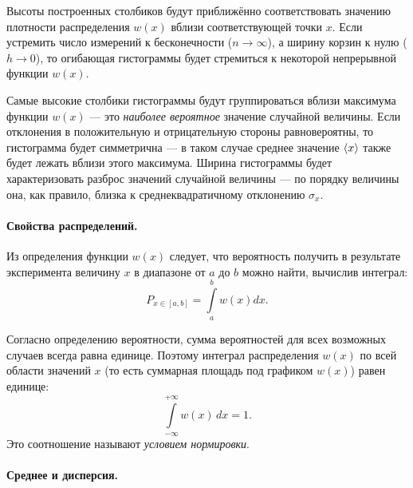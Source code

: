 Высоты построенных столбиков будут приближённо соответствовать значению
плотности распределения $w(x)$ вблизи соответствующей точки $x$.
Если устремить число измерений к бесконечности ($n\to \infty$), а ширину корзин
к нулю ($h\to0$), то огибающая гистограммы будет стремиться к некоторой
непрерывной функции $w(x)$.

Самые высокие столбики гистограммы будут группироваться вблизи максимума
функции $w(x)$ --- это \emph{наиболее вероятное} значение случайной величины.
Если отклонения в положительную и отрицательную стороны равновероятны,
то гистограмма будет симметрична --- в таком случае среднее значение $\left<x\right>$
также будет лежать вблизи этого максимума. Ширина гистограммы будет характеризовать разброс
значений случайной величины --- по порядку величины
она, как правило, близка к среднеквадратичному отклонению $\sigma_x$.

\paragraph{Свойства распределений.}

Из определения функции $w(x)$ следует, что вероятность получить в результате
эксперимента величину $x$ в диапазоне от $a$ до $b$
можно найти, вычислив интеграл:
\begin{equation}
    P_{x\in [a, b]}=\int\limits _{a}^{b}w\!\left(x\right)dx.\label{eq:P}
\end{equation}

Согласно определению вероятности, сумма вероятностей для всех возможных случаев
всегда равна единице. Поэтому интеграл распределения $w(x)$ по всей области
значений $x$ (то есть суммарная площадь под графиком $w(x)$) равен единице:
\[
\int\limits_{-\infty}^{+\infty} w(x)\,dx=1.
\]
Это соотношение называют \emph{условием нормировки}.

\paragraph{Среднее и дисперсия.}

